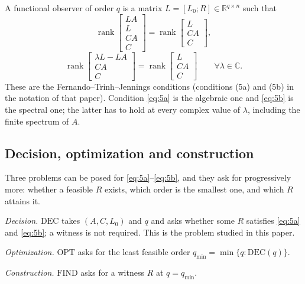 \documentclass[journal]{IEEEtran}
\theoremstyle{plainn}
\begin{document}
A functional observer of order $q$ is a matrix $L=[L_0;R]\in\mathbb R^{q\times n}$ such
that
\begin{equation}\label{eq:5a}
\operatorname{rank}\begin{bmatrix}LA\\ L\\ CA\\ C\end{bmatrix}
=\operatorname{rank}\begin{bmatrix}L\\ CA\\ C\end{bmatrix},
\end{equation}
\begin{equation}\label{eq:5b}
\operatorname{rank}\begin{bmatrix}\lambda L-LA\\ CA\\ C\end{bmatrix}
=\operatorname{rank}\begin{bmatrix}L\\ CA\\ C\end{bmatrix}
\qquad\forall\lambda\in\mathbb C.
\end{equation}
These are the Fernando--Trinh--Jennings conditions \cite{fer10} (conditions (5a) and (5b)
in the notation of that paper). Condition \eqref{eq:5a} is the algebraic one and
\eqref{eq:5b} is the spectral one; the latter has to hold at every complex value of
$\lambda$, including the finite spectrum of $A$.

\subsection{Decision, optimization and construction}\label{sec:problems}

Three problems can be posed for \eqref{eq:5a}--\eqref{eq:5b}, and they ask for
progressively more: whether a feasible $R$ exists, which order is the smallest one, and
which $R$ attains it.

\emph{Decision.} $\mathrm{DEC}$ takes $(A,C,L_0)$ and $q$ and asks whether some $R$
satisfies \eqref{eq:5a} and \eqref{eq:5b}; a witness is not required. This is the problem
studied in this paper.

\emph{Optimization.} $\mathrm{OPT}$ asks for the least feasible order
$q_{\min}=\min\{q:\mathrm{DEC}(q)\}$.

\emph{Construction.} $\mathrm{FIND}$ asks for a witness $R$ at $q=q_{\min}$.
\end{document}
